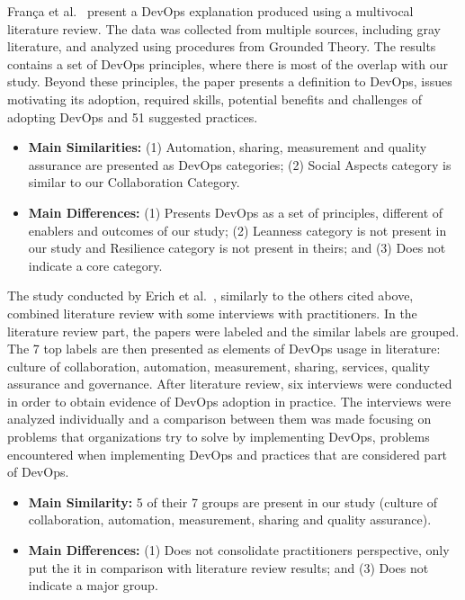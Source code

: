 Fran\c{c}a et al.~\cite{characterizing_devops_sbes_2016} present a DevOps
explanation produced using a multivocal literature review. The data was collected
from multiple sources, including gray literature, and analyzed using procedures
from Grounded Theory. The results contains a set of DevOps principles, where
there is most of the overlap with our study. Beyond these principles, the paper
presents a definition to DevOps, issues motivating its adoption, required skills,
potential benefits and challenges of adopting DevOps and 51 suggested practices.
\begin{itemize}
\item \textbf{Main Similarities:}
  (1) Automation, sharing, measurement and quality assurance are presented as DevOps
  categories;
  (2) Social Aspects category is similar to our Collaboration Category.

\item \textbf{Main Differences:}
  (1) Presents DevOps as a set of principles, different of enablers and outcomes of
  our study;
  (2) Leanness category is not present in our study and Resilience category is not
  present in theirs; and (3) Does not indicate a core category.

\end{itemize}

The study conducted by Erich et al.~\cite{qualitative_devops_journalsw_17},
similarly to the others cited above, combined literature review with some
interviews with practitioners. In the literature review part, the papers were
labeled and the similar labels are grouped. The 7 top labels are then presented
as elements of DevOps usage in literature: culture of collaboration, automation,
measurement, sharing, services, quality assurance and governance. After literature
review, six interviews were conducted in order to obtain evidence of DevOps
adoption in practice. The interviews were analyzed individually and a comparison
between them was made focusing on problems that organizations try to solve by
implementing DevOps, problems encountered when implementing DevOps and practices
that are considered part of DevOps.

\begin{itemize}
\item \textbf{Main Similarity:} 5 of their 7 groups are present in our study
(culture of collaboration, automation, measurement, sharing and quality assurance).
\item \textbf{Main Differences:} (1) Does not consolidate practitioners
perspective, only put the it in comparison with literature review results; and
(3) Does not indicate a major group.
\end{itemize}

